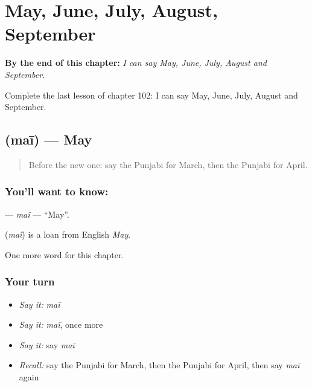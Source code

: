 
\chapter{May, June, July, August, September}
\label{ch:pa-may-june-july-august-september}

\begin{chapteropening}
\textbf{By the end of this chapter:} \emph{I can say May, June, July, August and September.}

Complete the last lesson of chapter 102: I can say May, June, July, August and September.
\end{chapteropening}

\section[\texorpdfstring{\pa{ਮਈ} (maī)}{ਮਈ (maī)}]{ (maī) — May}

\label{lesson:PA-C102-mai}



\begin{quote}
Before the new one: say the Punjabi for March, then the Punjabi for April.
\end{quote}

\subsection*{You'll want to know: }
\textbf{} — \emph{maī} — \textquotedblleft{}May\textquotedblright{}.

\begin{cousinweb}
\textbf{} (\emph{maī}) is a loan from English \emph{May}.
\end{cousinweb}

\begin{grammarlens}[title={What you've built}]
One more word for this chapter.
\end{grammarlens}

\subsection*{Your turn}
\begin{itemize}
\raggedright
  \item \emph{Say it:} \emph{maī}
  \item \emph{Say it:} \emph{maī}, once more
  \item \emph{Say it:} say \emph{maī}
  \item \emph{Recall:} say the Punjabi for March, then the Punjabi for April, then say \emph{maī} again
\end{itemize}

